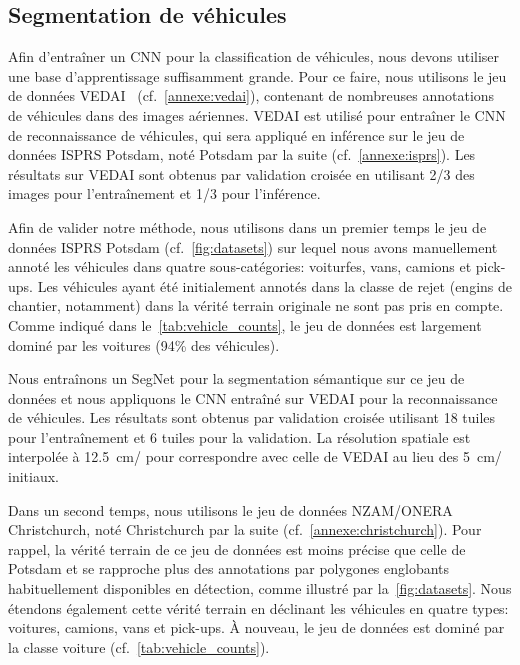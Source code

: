 \subsection{Segmentation de véhicules}

Afin d'entraîner un \gls{CNN} pour la classification de véhicules, nous devons utiliser une base d'apprentissage suffisamment grande. Pour ce faire, nous utilisons le jeu de données \gls{VEDAI}~\cite{razakarivony_vehicle_2016} (cf.~\cref{annexe:vedai}), contenant de nombreuses annotations de véhicules dans des images aériennes. \gls{VEDAI} est utilisé pour entraîner le \gls{CNN} de reconnaissance de véhicules, qui sera appliqué en inférence sur le jeu de données \gls{ISPRS} Potsdam, noté Potsdam par la suite (cf.~\cref{annexe:isprs}). Les résultats sur \gls{VEDAI} sont obtenus par validation croisée en utilisant 2/3 des images pour l'entraînement et 1/3 pour l'inférence.

Afin de valider notre méthode, nous utilisons dans un premier temps le jeu de données \gls{ISPRS} Potsdam (cf.~\cref{fig:datasets}) sur lequel nous avons manuellement annoté les véhicules dans quatre sous-catégories: voiturfes, vans, camions et pick-ups. Les véhicules ayant été initialement annotés dans la classe de rejet (engins de chantier, notamment) dans la vérité terrain originale ne sont pas pris en compte. Comme indiqué dans le~\cref{tab:vehicle_counts}, le jeu de données est largement dominé par les voitures (94\% des véhicules).

Nous entraînons un SegNet pour la segmentation sémantique sur ce jeu de données et nous appliquons le \gls{CNN} entraîné sur \gls{VEDAI} pour la reconnaissance de véhicules. Les résultats sont obtenus par validation croisée utilisant 18 tuiles pour l'entraînement et 6 tuiles pour la validation. La résolution spatiale est interpolée à \SI{12,5}{\centi\meter/\px} pour correspondre avec celle de \gls{VEDAI} au lieu des \SI{5}{\centi\meter/\px} initiaux.

Dans un second temps, nous utilisons le jeu de données NZAM/ONERA Christchurch, noté Christchurch par la suite (cf.~\cref{annexe:christchurch}). Pour rappel, la vérité terrain de ce jeu de données est moins précise que celle de Potsdam et se rapproche plus des annotations par polygones englobants habituellement disponibles en détection, comme illustré par la~\cref{fig:datasets}. Nous étendons également cette vérité terrain en déclinant les véhicules en quatre types: voitures, camions, vans et pick-ups. À nouveau, le jeu de données est dominé par la classe voiture (cf.~\cref{tab:vehicle_counts}).

